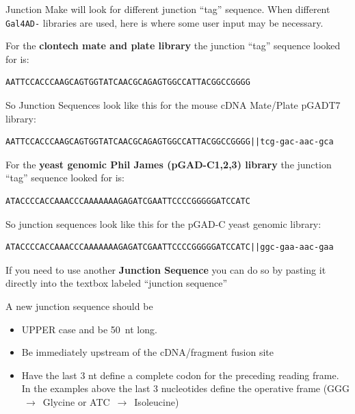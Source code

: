 \documentclass[11pt,fleqn]{book} %
\newcommand{\JunctionMake}{{\color{Blue} Junction Make }}
\begin{document}
\JunctionMake will look for different junction ``tag'' sequence. When different \texttt{Gal4AD-} libraries are used, here is where some user input may be necessary.

\vspace{15pt}

For the \textbf{clontech mate and plate library} the junction ``tag'' sequence looked for is:
\begin{lstlisting}
AATTCCACCCAAGCAGTGGTATCAACGCAGAGTGGCCATTACGGCCGGGG
\end{lstlisting}


So Junction Sequences look like this for the mouse cDNA Mate/Plate pGADT7 library:
\begin{lstlisting}
AATTCCACCCAAGCAGTGGTATCAACGCAGAGTGGCCATTACGGCCGGGG||tcg-gac-aac-gca
\end{lstlisting}

\vspace{15pt}

For the \textbf{yeast genomic Phil James (pGAD-C1,2,3) library} the junction ``tag'' sequence looked for is:
\begin{lstlisting}
ATACCCCACCAAACCCAAAAAAAGAGATCGAATTCCCCGGGGGATCCATC
\end{lstlisting}

So junction sequences look like this for the pGAD-C yeast genomic library:
\begin{lstlisting}
ATACCCCACCAAACCCAAAAAAAGAGATCGAATTCCCCGGGGGATCCATC||ggc-gaa-aac-gaa
\end{lstlisting}

If you need to use another \textbf{Junction Sequence} you can do so by pasting it directly into the textbox labeled ``junction sequence''

\begin{remark}
A new junction sequence should be 
\begin{itemize}
	\item UPPER case and be 50~nt long.
	\item Be immediately upstream of the cDNA/fragment fusion site
	\item Have the last 3 nt define a complete codon for the preceding reading frame. In the examples above the last 3 nucleotides define the operative frame (GGG $\,\to\,$ Glycine or ATC $\,\to\,$ Isoleucine)
\end{itemize}

\end{remark}
\end{document}
